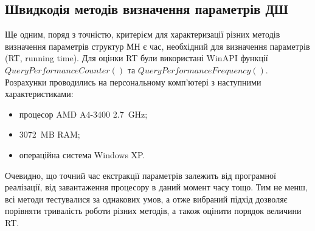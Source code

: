 \subsection{Швидкодія методів визначення параметрів ДШ}
Ще одним, поряд з точністю, критерієм для характеризації різних методів визначення параметрів структур МН є час, необхідний для визначення параметрів (RT, running time).
Для оцінки RT були використані WinAPI функції $QueryPerformanceCounter()$ та $QueryPerformanceFrequency()$.
Розрахунки проводились на персональному комп'ютері з наступними характеристиками:
\begin{itemize}
  \item процесор AMD A4-3400 2.7~GHz;
  \item 3072~MB RAM;
  \item операційна система Windows XP.
\end{itemize}
Очевидно, що точний час екстракції параметрів залежить від програмної реалізації, від завантаження процесору в даний момент часу тощо.
Тим не менш, всі методи тестувалися за однакових умов, а отже вибраний підхід дозволяє порівняти тривалість роботи різних методів, а також оцінити порядок величини RT.

